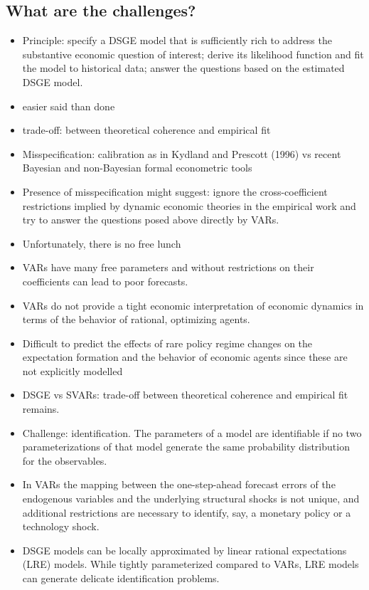 \documentclass[]{scrartcl}
\begin{document}
\begin{itemize}
\section{What are the challenges?}
\begin{itemize}
	\item Principle: specify a DSGE model that is sufficiently rich to address the substantive economic question of interest; derive its likelihood
	function and fit the model to historical data; answer the questions based on the estimated DSGE model. 
	\item easier said than done
	\item trade-off: between theoretical coherence and empirical fit
	\item Misspecification: calibration as in Kydland and Prescott (1996) vs recent	Bayesian and non-Bayesian formal econometric tools
	\item Presence of misspecification might suggest: ignore the cross-coefficient restrictions implied by dynamic economic theories in the empirical
	work and try to answer the questions posed above directly by VARs. 
	\item Unfortunately, there is no free lunch
	\item VARs have many free parameters and without restrictions on their coefficients can lead to poor forecasts. 
	\item VARs do not provide a tight economic interpretation of economic dynamics in terms of the behavior of rational, optimizing	agents. 
	\item Difficult to predict the effects of rare policy regime changes on the expectation formation and the behavior of economic agents since these are not explicitly modelled
	\item DSGE vs SVARs: trade-off between theoretical coherence and empirical fit remains.
	\item Challenge: identification. The parameters of a model are identifiable if no two parameterizations of that model generate the same probability distribution for the observables. 
	\item In VARs the mapping between the one-step-ahead forecast errors of the endogenous variables and the underlying structural shocks is not unique, and additional restrictions are necessary to identify, say, a monetary policy or a technology shock.
	\item DSGE models can be locally approximated by linear rational expectations (LRE) models. While tightly parameterized compared to VARs, LRE models can generate delicate identification problems.

\end{itemize}
\end{itemize}
\end{document}

